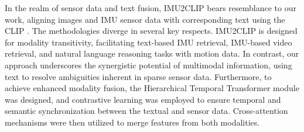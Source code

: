 \documentclass[letterpaper]{article} %
\begin{document}





In the realm of sensor data and text fusion, IMU2CLIP \cite{moon2022imu2clip} bears resemblance to our work,
aligning images and IMU sensor data with corresponding text using the CLIP \cite{radford2021learning}.
The methodologies diverge in several key respects. IMU2CLIP is designed for modality transitivity, facilitating text-based IMU retrieval, IMU-based video retrieval, and natural language reasoning tasks with motion data. In contrast, our approach underscores the synergistic potential of multimodal information, using text to resolve ambiguities inherent in sparse sensor data.
Furthermore, to achieve enhanced modality fusion, the Hierarchical Temporal Transformer module was designed, and contrastive learning was employed to ensure temporal and semantic synchronization between the textual and sensor data. Cross-attention mechanisms were then utilized to merge features from both modalities.
\end{document}
